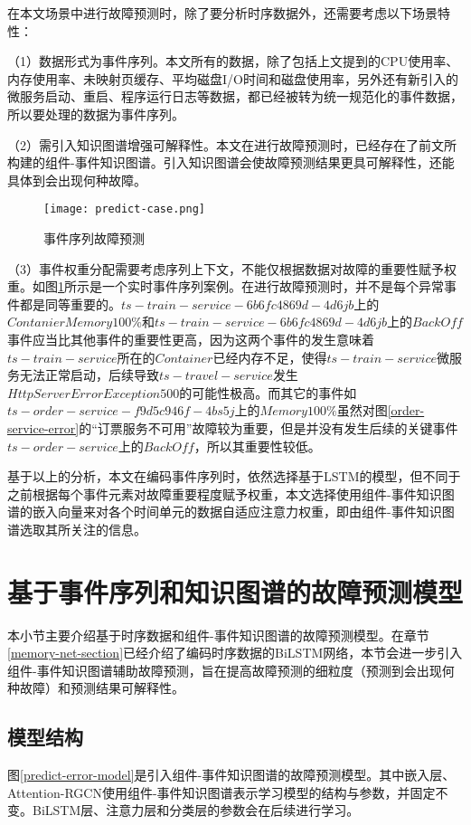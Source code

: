 在本文场景中进行故障预测时，除了要分析时序数据外，还需要考虑以下场景特性：

（1）数据形式为事件序列。本文所有的数据，除了包括上文提到的CPU使用率、内存使用率、未映射页缓存、平均磁盘I/O时间和磁盘使用率，另外还有新引入的微服务启动、重启、程序运行日志等数据，都已经被转为统一规范化的事件数据，所以要处理的数据为事件序列。

（2）需引入知识图谱增强可解释性。本文在进行故障预测时，已经存在了前文所构建的组件-事件知识图谱。引入知识图谱会使故障预测结果更具可解释性，还能具体到会出现何种故障。
\begin{figure}[htbp]
    \centering
    \texttt{[image: predict-case.png]}
    \caption{事件序列故障预测\label{predict-case}}
\end{figure}

（3）事件权重分配需要考虑序列上下文，不能仅根据数据对故障的重要性赋予权重。如图\ref{predict-case}所示是一个实时事件序列案例。在进行故障预测时，并不是每个异常事件都是同等重要的。$ts-train-service-6b6fc4869d-4d6jb$上的$Contanier Memory 100\%$和$ts-train-service-6b6fc4869d-4d6jb$上的$BackOff$事件应当比其他事件的重要性更高，因为这两个事件的发生意味着$ts-train-service$所在的$Container$已经内存不足，使得$ts-train-service$微服务无法正常启动，后续导致$ts-travel-service$发生$HttpServerErrorException 500$的可能性极高。而其它的事件如$ts-order-service-f9d5c946f-4bs5j$上的$Memory 100\%$虽然对图\ref{order-service-error}的“订票服务不可用”故障较为重要，但是并没有发生后续的关键事件$ts-order-service$上的$BackOff$，所以其重要性较低。

基于以上的分析，本文在编码事件序列时，依然选择基于LSTM的模型，但不同于之前根据每个事件元素对故障重要程度赋予权重\cite{gao2020task}，本文选择使用组件-事件知识图谱的嵌入向量来对各个时间单元的数据自适应注意力权重，即由组件-事件知识图谱选取其所关注的信息。

\section{基于事件序列和知识图谱的故障预测模型}\label{kg-pre-error}
本小节主要介绍基于时序数据和组件-事件知识图谱的故障预测模型。在章节\ref{memory-net-section}已经介绍了编码时序数据的BiLSTM网络，本节会进一步引入组件-事件知识图谱辅助故障预测，旨在提高故障预测的细粒度（预测到会出现何种故障）和预测结果可解释性。
\subsection{模型结构}

图\ref{predict-error-model}是引入组件-事件知识图谱的故障预测模型。其中嵌入层、Attention-RGCN使用组件-事件知识图谱表示学习模型的结构与参数，并固定不变。BiLSTM层、注意力层和分类层的参数会在后续进行学习。

